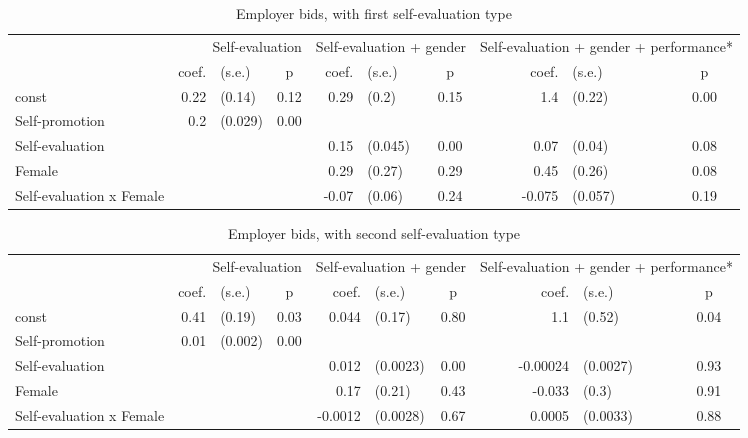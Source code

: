 \begin{table}
\centering
\caption{Employer bids, with first self-evaluation type}
\begin{tabular}{lrlc|rlc|rlc}
\toprule
 & \multicolumn{3}{p{12em}}{Self-evaluation} & \multicolumn{3}{p{12em}}{Self-evaluation + gender} & \multicolumn{3}{p{12em}}{Self-evaluation + gender + performance*} \\
 & coef. & (s.e.) & p & coef. & (s.e.) & p & coef. & (s.e.) & p \\
\midrule
const & 0.22 & (0.14) & 0.12 & 0.29 & (0.2) & 0.15 & 1.4 & (0.22) & 0.00 \\
Self-promotion & 0.2 & (0.029) & 0.00 &  &  &  &  &  &  \\
Self-evaluation &  &  &  & 0.15 & (0.045) & 0.00 & 0.07 & (0.04) & 0.08 \\
Female &  &  &  & 0.29 & (0.27) & 0.29 & 0.45 & (0.26) & 0.08 \\
Self-evaluation x Female &  &  &  & -0.07 & (0.06) & 0.24 & -0.075 & (0.057) & 0.19 \\
\bottomrule
\end{tabular}
\end{table}

\begin{table}
\centering
\caption{Employer bids, with second self-evaluation type}
\begin{tabular}{lrlc|rlc|rlc}
\toprule
 & \multicolumn{3}{p{12em}}{Self-evaluation} & \multicolumn{3}{p{12em}}{Self-evaluation + gender} & \multicolumn{3}{p{12em}}{Self-evaluation + gender + performance*} \\
 & coef. & (s.e.) & p & coef. & (s.e.) & p & coef. & (s.e.) & p \\
\midrule
const & 0.41 & (0.19) & 0.03 & 0.044 & (0.17) & 0.80 & 1.1 & (0.52) & 0.04 \\
Self-promotion & 0.01 & (0.002) & 0.00 &  &  &  &  &  &  \\
Self-evaluation &  &  &  & 0.012 & (0.0023) & 0.00 & -0.00024 & (0.0027) & 0.93 \\
Female &  &  &  & 0.17 & (0.21) & 0.43 & -0.033 & (0.3) & 0.91 \\
Self-evaluation x Female &  &  &  & -0.0012 & (0.0028) & 0.67 & 0.0005 & (0.0033) & 0.88 \\
\bottomrule
\end{tabular}
\end{table}


